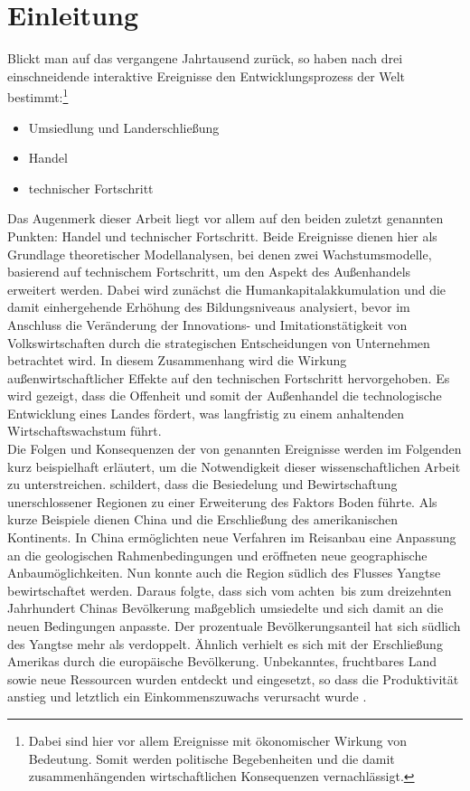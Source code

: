 \chapter{Einleitung}\label{Einleitung}
%
Blickt man auf das vergangene Jahrtausend zurück, so haben nach \cite{Maddison.2001} drei einschneidende interaktive Ereignisse den Entwicklungsprozess der Welt bestimmt:\footnote{Dabei sind hier vor allem Ereignisse mit ökonomischer Wirkung von Bedeutung. Somit werden politische Begebenheiten und die damit zusammenhängenden wirtschaftlichen Konsequenzen vernachlässigt.}
%
\begin{itemize}
	\item Umsiedlung und Landerschließung
	\item Handel
	\item technischer Fortschritt
\end{itemize}
%
Das Augenmerk dieser Arbeit liegt vor allem auf den beiden zuletzt genannten Punkten: Handel und technischer Fortschritt. Beide Ereignisse dienen hier als Grundlage theoretischer Modellanalysen, bei denen zwei Wachstumsmodelle, basierend auf technischem Fortschritt, um den Aspekt des Außenhandels erweitert werden. Dabei wird zunächst die Humankapitalakkumulation und die damit einhergehende Erhöhung des Bildungsniveaus analysiert, bevor im Anschluss die Veränderung der Innovations- und Imitationstätigkeit von Volkswirtschaften durch die strategischen Entscheidungen von Unternehmen betrachtet wird. In diesem Zusammenhang wird die Wirkung außenwirtschaftlicher Effekte auf den technischen Fortschritt hervorgehoben. Es wird gezeigt, dass die Offenheit und somit der Außenhandel die technologische Entwicklung eines Landes fördert, was langfristig zu einem anhaltenden Wirtschaftswachstum führt. \\
%
Die Folgen und Konsequenzen der von \cite{Maddison.2001} genannten Ereignisse werden im Folgenden kurz beispielhaft erläutert, um die Notwendigkeit dieser wissenschaftlichen Arbeit zu unterstreichen. \cite[S. 17]{Maddison.2001} schildert, dass die Besiedelung und Bewirtschaftung unerschlossener Regionen zu einer Erweiterung des Faktors Boden führte. Als kurze Beispiele dienen China und die Erschließung des amerikanischen Kontinents.  In China ermöglichten neue Verfahren im Reisanbau eine Anpassung an die geologischen Rahmenbedingungen und eröffneten neue geographische Anbaumöglichkeiten. Nun konnte auch die Region südlich des Flusses Yangtse bewirtschaftet werden. Daraus folgte, dass sich vom achten~bis zum dreizehnten Jahrhundert Chinas Bevölkerung maßgeblich umsiedelte und sich damit an die neuen Bedingungen anpasste. Der prozentuale Bevölkerungsanteil hat sich südlich des Yangtse mehr als verdoppelt. Ähnlich verhielt es sich mit der Erschließung Amerikas durch die europäische Bevölkerung. Unbekanntes, fruchtbares Land sowie neue Ressourcen wurden entdeckt und eingesetzt, so dass die Produktivität anstieg und letztlich ein Einkommenszuwachs verursacht wurde \cite[S. 17-18]{Maddison.2001}.\\
